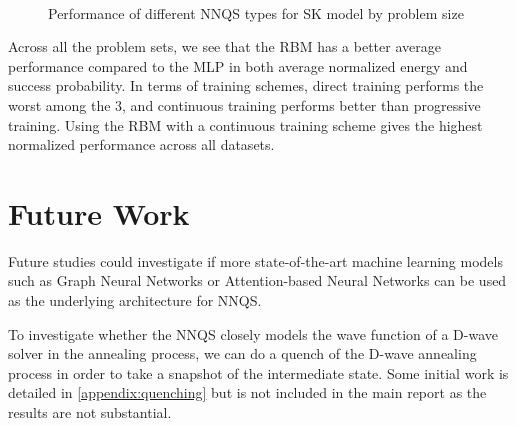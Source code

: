 \begin{figure}[!h]
    \centering
    \\
    \caption{Performance of different NNQS types for SK model by problem size}
    \label{nnqs-skmodel-size}
\end{figure}

Across all the problem sets, we see that the RBM has a better average performance compared to the MLP in both average normalized energy and success probability. In terms of training schemes, direct training performs the worst among the 3, and continuous training performs better than progressive training. Using the RBM with a continuous training scheme gives the highest normalized performance across all datasets.

\section{Future Work}
Future studies could investigate if more state-of-the-art machine learning models such as Graph Neural Networks or Attention-based Neural Networks can be used as the underlying architecture for NNQS.

To investigate whether the NNQS closely models the wave function of a D-wave solver in the annealing process, we can do a quench of the D-wave annealing process in order to take a snapshot of the intermediate state. Some initial work is detailed in \autoref{appendix:quenching} but is not included in the main report as the results are not substantial.